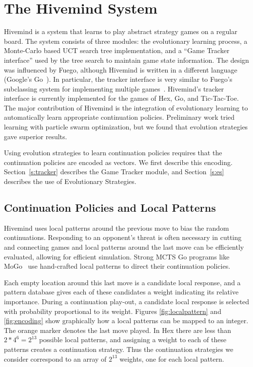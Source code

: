 \documentclass{acm_proc_article-sp}
\begin{document}
\section{The Hivemind System}\label{hivemind}

Hivemind is a system that learns to play abstract strategy games on a regular board. 
The system consists of three modules: the evolutionary learning process, a Monte-Carlo based UCT search tree implementation, and a ``Game Tracker interface'' used by the tree search to maintain game state information. 
The design was influenced by Fuego, although Hivemind is written in a different language (Google's Go~\cite{golang}). 
In particular, the tracker interface is very similar to Fuego's subclassing system for implementing multiple games~\cite{Fuego}. 
Hivemind's tracker interface is currently implemented for the games of Hex, Go, and Tic-Tac-Toe. 
The major contribution of Hivemind is the integration of evolutionary learning to automatically learn appropriate continuation policies.
Preliminary work tried learning with particle swarm optimization, but we found that evolution strategies gave
superior results.

Using evolution strategies to learn continuation policies requires that the continuation policies are encoded as vectors.
We first describe this encoding.  Section~\ref{s:tracker} describes the Game Tracker module, and Section~\ref{s:es} describes the
use of Evolutionary Strategies.

\subsection{Continuation Policies and Local Patterns}
\label{s:policies}

Hivemind uses local patterns around the previous move to bias the random continuations.
Responding to an opponent's threat is often necessary in cutting and connecting games
and local patterns around the last move can be efficiently evaluated, allowing for efficient simulation.
Strong MCTS Go programs like MoGo~\cite{gelly2006modification} use hand-crafted local patterns to direct their  continuation policies.

Each empty location around this last move is a candidate local response, and a pattern database gives each of these candidates a
weight indicating its relative importance.
During a continuation play-out, a candidate local response is selected with probability proportional to its weight.
Figures \ref{fig:localpattern} and \ref{fig:encoding} show graphically how a local patterns can be mapped to an integer. 
The orange marker denotes the last move played. 
In Hex there are less than $2 * 4^6=2^{13}$ possible local patterns, and 
assigning a weight to each of these patterns creates a continuation strategy.
Thus the continuation strategies we consider correspond to an array of $2^{13}$ weights, one for each local pattern.
\end{document}
